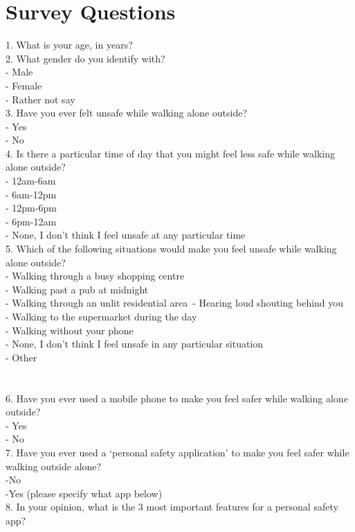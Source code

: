 \documentclass[a4paper]{report}
\begin{document}
\chapter{Survey Questions}
\label{app:Survey}

1. What is your age, in years? \\
2. What gender do you identify with? \\
	- Male\\
	- Female \\
	- Rather not say\\
3. Have you ever felt unsafe while walking alone outside? \\
- Yes\\
- No\\
4. Is there a particular time of day that you might feel less safe while walking alone outside?\\
	- 12am-6am\\
	- 6am-12pm\\
	- 12pm-6pm\\
	- 6pm-12am\\
	- None, I don't think I feel unsafe at any particular time\\
5. Which of the following situations would make you feel unsafe while walking alone outside?\\
- Walking through a busy shopping centre\\
- Walking past a pub at midnight\\
- Walking through an unlit residential area\
- Hearing loud shouting behind you\\
- Walking to the supermarket during the day\\
- Walking without your phone\\
- None, I don't think I feel unsafe in any particular situation\\
- Other\\ \\ \\
6. Have you ever used a mobile phone to make you feel safer while walking alone outside?\\
- Yes\\
- No\\
7. Have you ever used a ‘personal safety application’ to make you feel safer while walking outside alone?\\
-No\\
-Yes (please specify what app below)\\
8. In your opinion, what is the 3 most important features for a personal safety app?\\
\end{document}

